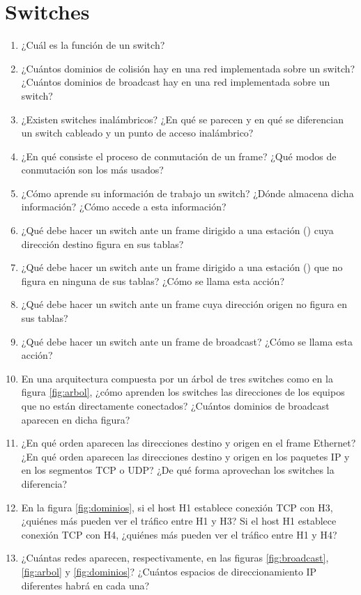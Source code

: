 \section{Switches}
\label{sub:Switches}

\begin{enumerate}
\item ¿Cuál es la función de un switch? 
\item ¿Cuántos dominios de colisión hay en una red implementada sobre un switch? ¿Cuántos dominios de broadcast hay en una red implementada sobre un switch?
\item ¿Existen switches inalámbricos? ¿En qué se parecen y en qué se diferencian un switch cableado y un punto de acceso inalámbrico? 
\item ¿En qué consiste el proceso de conmutación de un frame? ¿Qué modos de conmutación son los más usados?
\item ¿Cómo aprende su información de trabajo un switch? ¿Dónde almacena dicha información? ¿Cómo accede a esta información?
\item ¿Qué debe hacer un switch ante un frame dirigido a una estación () cuya dirección destino figura en sus tablas? 
\item ¿Qué debe hacer un switch ante un frame dirigido a una estación () que no figura en ninguna de sus tablas? ¿Cómo se llama esta acción?
\item ¿Qué debe hacer un switch ante un frame cuya dirección origen no figura en sus tablas? 
\item ¿Qué debe hacer un switch ante un frame de broadcast? ¿Cómo se llama esta acción?
\item En una arquitectura compuesta por un árbol de tres switches como en la figura \ref{fig:arbol}, ¿cómo aprenden los switches las direcciones de los equipos que no están directamente conectados? ¿Cuántos dominios de broadcast aparecen en dicha figura?
\item ¿En qué orden aparecen las direcciones destino y origen en el frame Ethernet? ¿En qué orden aparecen las direcciones destino y origen en los paquetes IP y en los segmentos TCP o UDP? ¿De qué forma aprovechan los switches la diferencia?

\item En la figura \ref{fig:dominios}, si el host H1 establece conexión TCP con H3, ¿quiénes más pueden ver el tráfico entre H1 y H3? Si el host H1 establece conexión TCP con H4, ¿quiénes más pueden ver el tráfico entre H1 y H4?
\item ¿Cuántas redes aparecen, respectivamente, en las figuras \ref{fig:broadcast}, \ref{fig:arbol} y \ref{fig:dominios}? ¿Cuántos espacios de direccionamiento IP diferentes habrá en cada una?
\end{enumerate}


